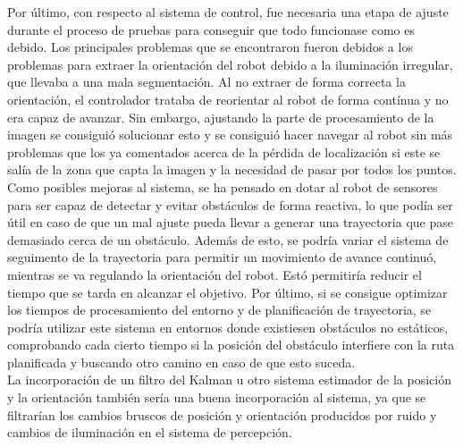 Por último, con respecto al sistema de control, fue necesaria una etapa de ajuste durante el proceso de pruebas para conseguir que todo funcionase como es debido. Los principales problemas que se encontraron fueron debidos a los problemas para extraer la orientación del robot debido a la iluminación irregular, que llevaba a una mala segmentación. Al no extraer de forma correcta la orientación, el controlador trataba de reorientar al robot de forma contínua y no era capaz de avanzar. Sin embargo, ajustando la parte de procesamiento de la imagen se consiguió solucionar esto y se consiguió hacer navegar al robot sin más problemas que los ya comentados acerca de la pérdida de localización si este se salía de la zona que capta la imagen y la necesidad de pasar por todos los puntos.\\

Como posibles mejoras al sistema, se ha pensado en dotar al robot de sensores para ser capaz de detectar y evitar obstáculos de forma reactiva, lo que podía ser útil en caso de que un mal ajuste pueda llevar a generar una trayectoria que pase demasiado cerca de un obstáculo. Además de esto, se podría variar el sistema de seguimento de la trayectoria para permitir un movimiento de avance continuó, mientras se va regulando la orientación del robot. Estó permitiría reducir el tiempo que se tarda en alcanzar el objetivo. Por último, si se consigue optimizar los tiempos de procesamiento del entorno y de planificación de trayectoria, se podría utilizar este sistema en entornos donde existiesen obstáculos no estáticos, comprobando cada cierto tiempo si la posición del obstáculo interfiere con la ruta planificada y buscando otro camino en caso de que esto suceda.\\  

La incorporación de un filtro del Kalman u otro sistema estimador de la posición y la orientación también sería una buena incorporación al sistema, ya que se filtrarían los cambios bruscos de posición y orientación producidos por ruido y cambios de iluminación en el sistema de percepción.\\